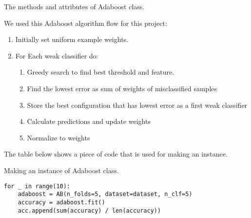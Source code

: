 \begin{table}[H]
\centering
\caption{The methods and attributes of Adaboost class.}
\label{tab:tab_ab}

\end{table}
We used this Adaboost algorithm flow for this project:
\begin{enumerate}
    \item Initially set uniform example weights.
    \item For Each weak classifier do:
    \begin{enumerate}
        \item Greedy search to find best threshold and feature.
        \item Find the lowest error as sum of weights of misclassified samples 
        \item Store the best configuration that has lowest error as a first weak classifier
        \item Calculate predictions and update weights
        \item Normalize to weights
    \end{enumerate}

\end{enumerate}

The table below shows a piece of code that is used for making an instance. 

\begin{table}[H]
\centering
\caption{Making an instance of Adaboost class.}
\begin{lstlisting}
for _ in range(10):
    adaboost = AB(n_folds=5, dataset=dataset, n_clf=5)
    accuracy = adaboost.fit()
    acc.append(sum(accuracy) / len(accuracy))
\end{lstlisting}
\end{table}